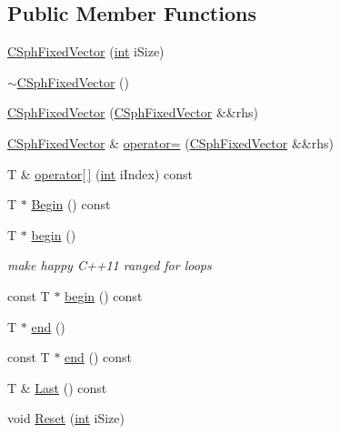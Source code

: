 \subsection*{Public Member Functions}
\begin{DoxyCompactItemize}
\item 
\hyperlink{classCSphFixedVector_ae15d1b4714a7648fb3558a7c3429e271}{C\-Sph\-Fixed\-Vector} (\hyperlink{sphinxexpr_8cpp_a4a26e8f9cb8b736e0c4cbf4d16de985e}{int} i\-Size)
\item 
\hyperlink{classCSphFixedVector_aae9aaa13a4e86a49a21485f94b1ba417}{$\sim$\-C\-Sph\-Fixed\-Vector} ()
\item 
\hyperlink{classCSphFixedVector_a247f3ca1aa39d479d095f1fd8356b074}{C\-Sph\-Fixed\-Vector} (\hyperlink{classCSphFixedVector}{C\-Sph\-Fixed\-Vector} \&\&rhs)
\item 
\hyperlink{classCSphFixedVector}{C\-Sph\-Fixed\-Vector} \& \hyperlink{classCSphFixedVector_a5ff381ebf3d542996c6a05091226a81d}{operator=} (\hyperlink{classCSphFixedVector}{C\-Sph\-Fixed\-Vector} \&\&rhs)
\item 
T \& \hyperlink{classCSphFixedVector_ae643bbc83c96038576a5ecf08b8754b1}{operator\mbox{[}$\,$\mbox{]}} (\hyperlink{sphinxexpr_8cpp_a4a26e8f9cb8b736e0c4cbf4d16de985e}{int} i\-Index) const 
\item 
T $\ast$ \hyperlink{classCSphFixedVector_a3a0cd5818d5f0ab0a6e41e51e5b95b7a}{Begin} () const 
\item 
T $\ast$ \hyperlink{classCSphFixedVector_a5ed509981e6ab248998283ec4798b974}{begin} ()
\begin{DoxyCompactList}\small\item\em make happy C++11 ranged for loops \end{DoxyCompactList}\item 
const T $\ast$ \hyperlink{classCSphFixedVector_aea7a129269837cd4bbc73abc68376af7}{begin} () const 
\item 
T $\ast$ \hyperlink{classCSphFixedVector_a92d87d26f950b62028aec1500ce7c944}{end} ()
\item 
const T $\ast$ \hyperlink{classCSphFixedVector_a755b86d8156e887426ad8a2cc4861e20}{end} () const 
\item 
T \& \hyperlink{classCSphFixedVector_a479948a1f9419f4afae95551dddd6cc9}{Last} () const 
\item 
void \hyperlink{classCSphFixedVector_a1e5c691f16703bb591c30f2b95622b62}{Reset} (\hyperlink{sphinxexpr_8cpp_a4a26e8f9cb8b736e0c4cbf4d16de985e}{int} i\-Size)
\item 

\end{DoxyCompactItemize}
